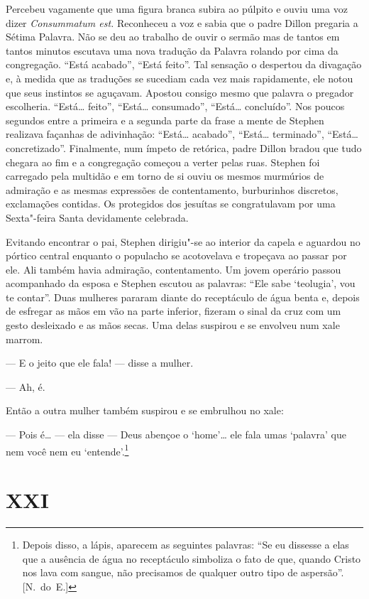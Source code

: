 Percebeu vagamente que uma figura branca subira ao púlpito e ouviu uma voz
dizer \textit{Consummatum est.}  Reconheceu a voz e sabia que o padre Dillon
pregaria a Sétima Palavra.  Não se deu ao trabalho de ouvir o sermão mas de		
tantos em tantos minutos escutava uma nova tradução da Palavra rolando por cima
da congregação.  “Está acabado”, “Está feito”.  Tal sensação o despertou da
divagação e, à medida que as traduções se sucediam cada vez mais rapidamente,
ele notou que seus instintos se aguçavam.  Apostou consigo mesmo que palavra o
pregador escolheria.  “Está\ldots{} feito”, “Está\ldots{} consumado”, “Está\ldots{}
concluído”.  Nos poucos segundos entre a primeira e a segunda parte da frase a
mente de Stephen realizava façanhas de adivinhação: “Está\ldots{} acabado”, “Está\ldots{}
terminado”, “Está\ldots{} concretizado”.  Finalmente, num ímpeto de retórica, padre
Dillon bradou que tudo chegara ao fim e a congregação começou a verter pelas
ruas.  Stephen foi carregado pela multidão e em torno de si ouviu os mesmos
murmúrios de admiração e as mesmas expressões de contentamento, burburinhos
discretos, exclamações contidas.  Os protegidos dos jesuítas se congratulavam
por uma Sexta"-feira Santa devidamente celebrada.

Evitando encontrar o pai, Stephen dirigiu"-se ao interior da capela e aguardou
no pórtico central enquanto o populacho se acotovelava e tropeçava ao passar
por ele.  Ali também havia admiração, contentamento.  Um jovem operário passou
acompanhado da esposa e Stephen escutou as palavras: “Ele sabe ‘teolugia’, vou
te contar”.  Duas mulheres pararam diante do receptáculo de água benta e,
depois de esfregar as mãos \label{em"-vao} em vão na parte inferior, fizeram o sinal da cruz
com um gesto desleixado e as mãos secas.  Uma delas suspirou e se envolveu num
xale marrom.

--- E o jeito que ele fala! --- disse a mulher.

--- Ah, é.

Então a outra mulher também suspirou e se embrulhou no xale:

--- Pois é\ldots{} --- ela disse --- Deus abençoe o ‘home’\ldots{} ele fala umas
‘palavra’ que nem você nem eu ‘entende’.\footnote{ Depois disso, a lápis,
aparecem as seguintes palavras: “Se eu dissesse a elas que a ausência de água
no receptáculo simboliza o fato de que, quando Cristo nos lava com sangue, não
precisamos de qualquer outro tipo de aspersão”. [N.~do~E.]}


\section{XXI}

